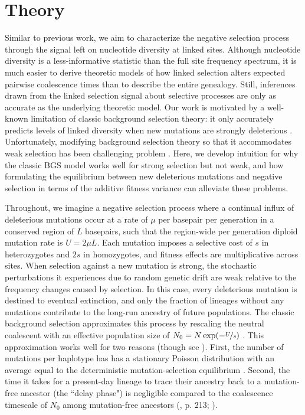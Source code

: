 \documentclass[11pt]{article}
\begin{document}
\section*{Theory}

Similar to previous work, we aim to characterize the negative selection process
through the signal left on nucleotide diversity at linked sites. Although
nucleotide diversity is a less-informative statistic than the full site
frequency spectrum, it is much easier to derive theoretic models of how linked
selection alters expected pairwise coalescence times than to describe the
entire genealogy. Still, inferences drawn from the linked selection signal
about selective processes are only as accurate as the underlying theoretic
model. Our work is motivated by a well-known limitation of classic background
selection theory: it only accurately predicts levels of linked diversity when
new mutations are strongly deleterious
\parencite{Charlesworth1993-gb,McVean2000-bt,Good2013-lp,Gordo2002-dr}.
Unfortunately, modifying background selection theory so that it accommodates
weak selection has been challenging problem
\parencite{Good2014-yz,Haigh1978-gt,Higgs1995-xc}. Here, we develop intuition
for why the classic BGS model works well for strong selection but not weak, and
how formulating the equilibrium between new deleterious mutations and negative
selection in terms of the additive fitness variance can alleviate these
problems.

Throughout, we imagine a negative selection process where a continual influx of
deleterious mutations occur at a rate of $\mu$ per basepair per generation in a
conserved region of $L$ basepairs, such that the region-wide per generation
diploid mutation rate is $U = 2 \mu L$. Each mutation imposes a selective cost
of $s$ in heterozygotes and $2s$ in homozygotes, and fitness effects are
multiplicative across sites. When selection against a new mutation is strong,
the stochastic perturbations it experiences due to random genetic drift are
weak relative to the frequency changes caused by selection. In this case, every
deleterious mutation is destined to eventual extinction, and only the fraction
of lineages without any mutations contribute to the long-run ancestry of future
populations. The classic background selection approximates this process by
rescaling the neutral coalescent with an effective population size of $N_0 = N
\exp(-\nicefrac{U}{s})$
\parencite{Charlesworth1993-gb,Nordborg1996-nq,Hudson1995-pt,Hudson1994-oh}.
This approximation works well for two reasons (though see
\cite{Cvijovic2018-vd,Walczak2012-fi,Nicolaisen2012-vs}). First, the number of
mutations per haplotype has has a stationary Poisson distribution with an
average equal to the deterministic mutation-selection equilibrium
\parencite{Haldane1927-ga}. Second, the time it takes for a present-day lineage
to trace their ancestry back to a mutation-free ancestor (the ``delay phase")
is negligible compared to the coalescence timescale of $N_0$ among
mutation-free ancestors (\cite{Durrett2008-ql}, p. 213; \cite{Good2014-yz}).
\end{document}
